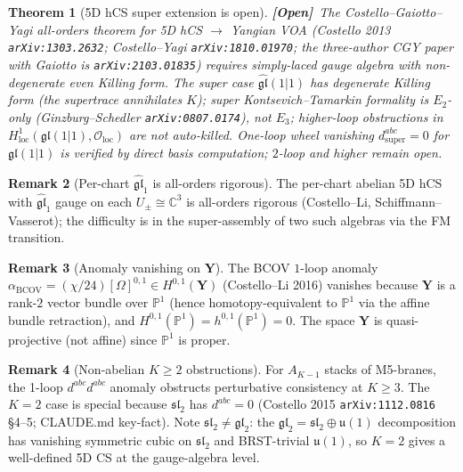 \documentclass[11pt]{amsart}
\newtheorem{theorem}{Theorem}[section]
\theoremstyle{definition}
\newtheorem{remark}[theorem]{Remark}
\providecommand{\bY}{\mathbf{Y}}
\providecommand{\cO}{\mathcal{O}}
\providecommand{\bC}{\mathbb{C}}
\providecommand{\bP}{\mathbb{P}}
\providecommand{\fgl}{\mathfrak{gl}}
\providecommand{\fsl}{\mathfrak{sl}}
\providecommand{\fu}{\mathfrak{u}}
\providecommand{\ClaimStatusOpen}{\textbf{\textsf{[Open]}}}
\begin{document}
\begin{theorem}[5D hCS super extension is open]
\label{thm:hcs-super-open}
\ClaimStatusOpen\
The Costello--Gaiotto--Yagi all-orders theorem for 5D hCS $\to$
Yangian VOA (Costello 2013 \texttt{arXiv:1303.2632}; Costello--Yagi
\texttt{arXiv:1810.01970}; the three-author CGY paper with
Gaiotto is \texttt{arXiv:2103.01835}) requires simply-laced gauge
algebra with non-degenerate even Killing form. The super case
$\widehat{\fgl}(1|1)$ has degenerate Killing form (the supertrace
annihilates $K$); super Kontsevich--Tamarkin formality is $E_2$-only
(Ginzburg--Schedler \texttt{arXiv:0807.0174}), not $E_3$; higher-loop
obstructions in $H^1_{\mathrm{loc}}(\fgl(1|1), \cO_{\mathrm{loc}})$
are not auto-killed. One-loop wheel vanishing
$d^{abc}_{\mathrm{super}} = 0$ for $\fgl(1|1)$ is verified by direct
basis computation; $2$-loop and higher remain open.
\end{theorem}

\begin{remark}[Per-chart $\widehat{\fgl}_1$ is all-orders rigorous]
The per-chart abelian 5D hCS with $\widehat{\fgl}_1$ gauge on each
$U_\pm \cong \bC^3$ is all-orders rigorous (Costello--Li, Schiffmann--Vasserot);
the difficulty is in the super-assembly of two such algebras via the
FM transition.
\end{remark}

\begin{remark}[Anomaly vanishing on $\bY$]
\label{rem:anomaly-vanishing}
The BCOV $1$-loop anomaly $\alpha_{\mathrm{BCOV}} = (\chi/24)[\Omega]^{0,1}
\in H^{0,1}(\bY)$ (Costello--Li 2016) vanishes because $\bY$ is a
rank-$2$ vector bundle over $\bP^1$ (hence homotopy-equivalent to
$\bP^1$ via the affine bundle retraction), and
$H^{0,1}(\bP^1) = h^{0,1}(\bP^1) = 0$. The space $\bY$ is
quasi-projective (not affine) since $\bP^1$ is proper.
\end{remark}

\begin{remark}[Non-abelian $K \geq 2$ obstructions]
For $A_{K-1}$ stacks of M5-branes, the 1-loop $d^{abc}d^{abc}$ anomaly
obstructs perturbative consistency at $K \geq 3$. The $K = 2$ case is
special because $\fsl_2$ has $d^{abc} = 0$ (Costello 2015 \texttt{arXiv:1112.0816}
§4--5; CLAUDE.md key-fact). Note $\fsl_2 \neq \fgl_2$: the $\fgl_2 =
\fsl_2 \oplus \fu(1)$ decomposition has vanishing symmetric cubic on
$\fsl_2$ and BRST-trivial $\fu(1)$, so $K = 2$ gives a well-defined
5D CS at the gauge-algebra level.
\end{remark}
\end{document}
